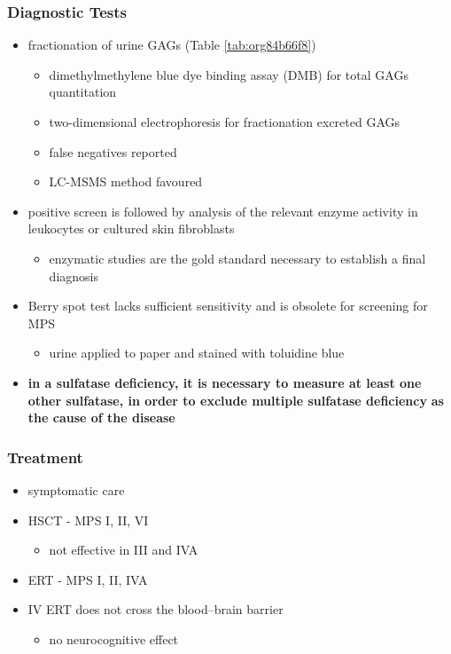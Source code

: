 \documentclass[12pt]{scrartcl}
\begin{document}
\subsubsection{Diagnostic Tests}
\label{sec:orgf15703f}
\begin{itemize}
\item fractionation of urine GAGs (Table \ref{tab:org84b66f8})
\begin{itemize}
\item dimethylmethylene blue dye binding assay (DMB) for total GAGs
quantitation
\item two-dimensional electrophoresis for fractionation excreted GAGs
\item false negatives reported
\item LC-MSMS method favoured
\end{itemize}
\item positive screen is followed by analysis of the relevant enzyme
activity in leukocytes or cultured skin fibroblasts
\begin{itemize}
\item enzymatic studies are the gold standard necessary to establish a
final diagnosis
\end{itemize}
\item Berry spot test lacks sufficient sensitivity and is obsolete for
screening for MPS
\begin{itemize}
\item urine applied to paper and stained with toluidine blue
\end{itemize}
\item \textbf{in a sulfatase deficiency, it is necessary to measure at least one}
\textbf{other sulfatase, in order to exclude multiple sulfatase deficiency}
\textbf{as the cause of the disease}
\end{itemize}

\subsubsection{Treatment}
\label{sec:org3c782ed}
\begin{itemize}
\item symptomatic care
\item HSCT - MPS I, II, VI
\begin{itemize}
\item not effective in III and IVA
\end{itemize}
\item ERT - MPS I, II, IVA
\item IV ERT does not cross the blood–brain barrier
\begin{itemize}
\item no neurocognitive effect
\end{itemize}
\end{itemize}
\end{document}

